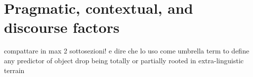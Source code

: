 



\section{Pragmatic, contextual, and discourse factors} 

compattare in max 2 sottosezioni! e dire che lo uso come umbrella term to define any predictor of object drop being totally or partially rooted in extra-linguistic terrain


